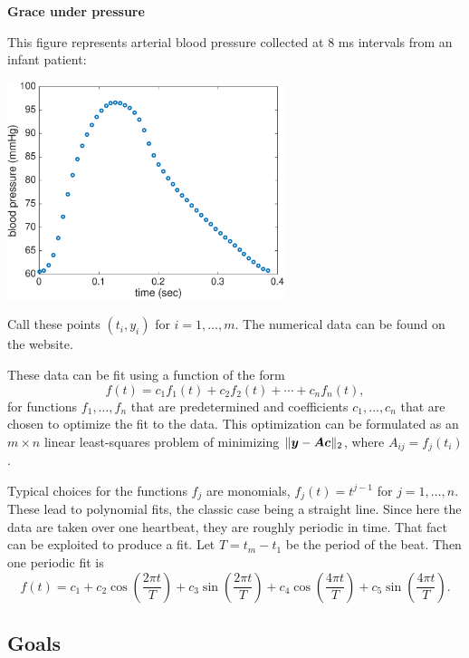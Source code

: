 \documentclass[11pt,twoside]{article}
\begin{document}
\begin{center}
  \bf Grace under pressure
\end{center}

This figure represents arterial blood pressure collected at 8 ms intervals
from an infant patient:
\begin{center}
  \includegraphics[height=2.5in]{fitfigure}
\end{center}
Call these points $(t_i,y_i)$ for $i=1,\ldots,m$. The numerical data
can be found on the website.

These data can be fit using a function of the form
\begin{equation}
  \label{eq:1}
  f(t) = c_1 f_1(t) + c_2 f_2(t) + \cdots + c_nf_n(t),
\end{equation}
for functions $f_1,\ldots,f_n$ that are predetermined and coefficients $c_1,\ldots,c_n$ that are chosen to optimize the fit to the data. This optimization can be formulated as an $m\times n$ linear least-squares problem of minimizing $\|\bm{y}-\bm{A}\bm{c}\|_2$, where $A_{ij} = f_j(t_i)$.

Typical choices for the functions $f_j$ are monomials, $f_j(t)=t^{j-1}$ for $j=1,\ldots,n$. These lead to polynomial fits, the classic case being a straight line. Since here the data are taken over one heartbeat, they are roughly periodic in time. That fact can be exploited to produce a fit. Let $T = t_m-t_1$ be the period of the beat. Then one periodic fit is
\begin{equation}
  \label{eq:2}
  f(t) = c_1 + c_2 \cos\left(\frac{2\pi t}{T}\right) +  c_3 \sin\left(\frac{2\pi t}{T}\right) + c_4 \cos\left(\frac{4\pi t}{T}\right) +  c_5 \sin\left(\frac{4\pi t}{T}\right).
\end{equation}

\subsection*{Goals}
\end{document}
